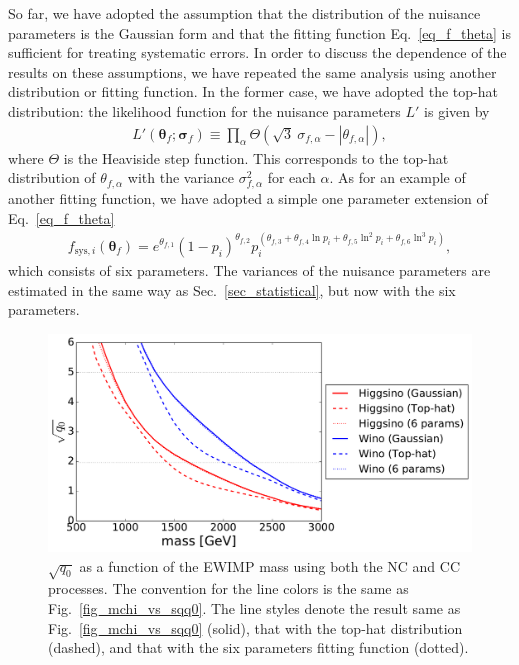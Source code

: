\documentclass[12pt, a4paper]{article}
\begin{document}
So far, we have adopted the assumption that the distribution of the
nuisance parameters is the Gaussian form and that the fitting function
Eq.~\eqref{eq_f_theta} is sufficient for treating systematic errors.
In order to discuss the dependence of the results on these
assumptions, we have repeated the same analysis using another
distribution or fitting function.  In the former case, we have adopted
the top-hat distribution: the likelihood function for the nuisance
parameters $L'$ is given by
\begin{align}
 L' (\bm{\theta}_f ; \bm{\sigma}_f) \equiv \prod_\alpha
 \Theta \left( \sqrt{3}\ \sigma_{f,\alpha}
 - \left| \theta_{f,\alpha} \right| \right),
\end{align}
where $\Theta$ is the Heaviside step function.  This corresponds to
the top-hat distribution of $\theta_{f,\alpha}$ with the variance
$\sigma_{f,\alpha}^2$ for each $\alpha$.  As for an example of another
fitting function, we have adopted a simple one parameter extension of
Eq.~\eqref{eq_f_theta}
\begin{align}
 f_{\mathrm{sys}, i} (\bm{\theta}_f) =
 e^{\theta_{f,1}} (1 - p_i)^{\theta_{f,2}}
 p_i^{(\theta_{f,3} + \theta_{f,4} \ln p_i + \theta_{f,5} \ln^2 p_i
 + \theta_{f,6} \ln^3 p_i)},\label{eq_6_param}
\end{align}
which consists of six parameters.
The variances of the nuisance parameters are estimated
in the same way as Sec.~\ref{sec_statistical}, but now with the six parameters.

\begin{figure}[t]
 \centering
 \includegraphics[width=0.7\linewidth]{mchi_vs_sqq0_comp.pdf}
 \caption{$\sqrt{q_0}$ as a function of the EWIMP mass using both the
 NC and CC processes.  The convention for the line colors is the same
 as Fig.~\ref{fig_mchi_vs_sqq0}.  The line styles denote the result
 same as Fig.~\ref{fig_mchi_vs_sqq0} (solid), that with the top-hat
 distribution (dashed), and that with the six parameters fitting
 function (dotted).}  \label{fig_mchi_vs_sqq0_comp}
\end{figure}
\end{document}
